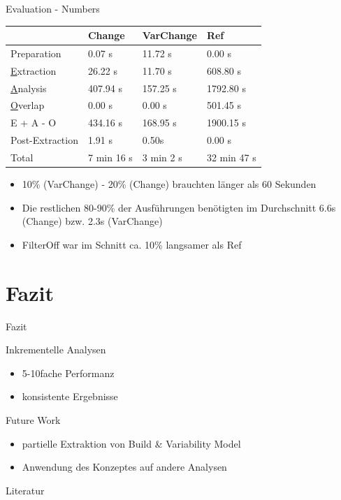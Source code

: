 \documentclass[aspectratio=43, noserifmath]{beamer}
\begin{document}
\begin{frame}{Evaluation - Numbers}
\begin{tabular}{|l | l | l | l|}
\hline
                               & Change                 & VarChange          & Ref  \\ \hline
	Preparation                & 0.07 s                & 11.72 s             & 0.00 s \\
	\underline{E}xtraction     & 26.22 s                & 11.70 s            & 608.80 s \\
	\underline{A}nalysis       & 407.94 s               & 157.25 s           & 1792.80 s \\
	\underline{O}verlap        & 0.00 s                 & 0.00 s             & 501.45 s \\
	E + A - O                  & 434.16 s               & 168.95 s           & 1900.15 s \\
	Post-Extraction             & 1.91 s                 & 0.50s              & 0.00 s \\ \hline
	Total                      & 7 min 16 s             & 3 min 2 s          & 32 min 47 s \\ \hline
\end{tabular}

\begin{itemize}
    \item[\textbullet] 10\% (VarChange) - 20\% (Change) brauchten l\"anger als 60 Sekunden
    \item[\textbullet] Die restlichen 80-90\% der Ausf\"uhrungen ben\"otigten im Durchschnitt 6.6s (Change) bzw. 2.3s (VarChange)
    \item[\textbullet] FilterOff war im Schnitt ca. 10\% langsamer als Ref
\end{itemize}
\end{frame}




\section{Fazit}
\begin{frame}{Fazit}

Inkrementelle Analysen
 
\begin{itemize}
    \item[\textbullet] 5-10fache Performanz
    \item[\textbullet]  konsistente Ergebnisse
\end{itemize}
Future Work
\begin{itemize}
    \item[\textbullet]  partielle Extraktion von Build \& Variability Model
    \item[\textbullet]  Anwendung des Konzeptes auf andere Analysen
\end{itemize}
\end{frame}

\begin{frame}{Literatur}


\end{frame}
\end{document}
